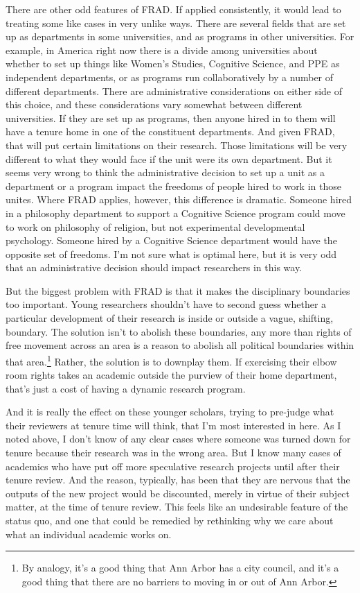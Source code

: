 \documentclass[
  11pt,
  letterpaper,
  DIV=11,
  numbers=noendperiod,
  twoside]{scrartcl}
\begin{document}
There are other odd features of FRAD. If applied consistently, it would
lead to treating some like cases in very unlike ways. There are several
fields that are set up as departments in some universities, and as
programs in other universities. For example, in America right now there
is a divide among universities about whether to set up things like
Women's Studies, Cognitive Science, and PPE as independent departments,
or as programs run collaboratively by a number of different departments.
There are administrative considerations on either side of this choice,
and these considerations vary somewhat between different universities.
If they are set up as programs, then anyone hired in to them will have a
tenure home in one of the constituent departments. And given FRAD, that
will put certain limitations on their research. Those limitations will
be very different to what they would face if the unit were its own
department. But it seems very wrong to think the administrative decision
to set up a unit as a department or a program impact the freedoms of
people hired to work in those unites. Where FRAD applies, however, this
difference is dramatic. Someone hired in a philosophy department to
support a Cognitive Science program could move to work on philosophy of
religion, but not experimental developmental psychology. Someone hired
by a Cognitive Science department would have the opposite set of
freedoms. I'm not sure what is optimal here, but it is very odd that an
administrative decision should impact researchers in this way.

But the biggest problem with FRAD is that it makes the disciplinary
boundaries too important. Young researchers shouldn't have to second
guess whether a particular development of their research is inside or
outside a vague, shifting, boundary. The solution isn't to abolish these
boundaries, any more than rights of free movement across an area is a
reason to abolish all political boundaries within that area.\footnote{By
  analogy, it's a good thing that Ann Arbor has a city council, and it's
  a good thing that there are no barriers to moving in or out of Ann
  Arbor.} Rather, the solution is to downplay them. If exercising their
elbow room rights takes an academic outside the purview of their home
department, that's just a cost of having a dynamic research program.

And it is really the effect on these younger scholars, trying to
pre-judge what their reviewers at tenure time will think, that I'm most
interested in here. As I noted above, I don't know of any clear cases
where someone was turned down for tenure because their research was in
the wrong area. But I know many cases of academics who have put off more
speculative research projects until after their tenure review. And the
reason, typically, has been that they are nervous that the outputs of
the new project would be discounted, merely in virtue of their subject
matter, at the time of tenure review. This feels like an undesirable
feature of the status quo, and one that could be remedied by rethinking
why we care about what an individual academic works on.
\end{document}
